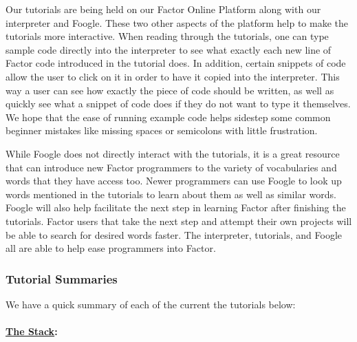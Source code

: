 \documentclass[
]{article}
\begin{document}
Our tutorials are being held on our Factor Online Platform along with
our interpreter and Foogle. These two other aspects of the platform help
to make the tutorials more interactive. When reading through the
tutorials, one can type sample code directly into the interpreter to see
what exactly each new line of Factor code introduced in the tutorial
does. In addition, certain snippets of code allow the user to click on
it in order to have it copied into the interpreter. This way a user can
see how exactly the piece of code should be written, as well as quickly
see what a snippet of code does if they do not want to type it
themselves. We hope that the ease of running example code helps sidestep
some common beginner mistakes like missing spaces or semicolons with
little frustration.

While Foogle does not directly interact with the tutorials, it is a
great resource that can introduce new Factor programmers to the variety
of vocabularies and words that they have access too. Newer programmers
can use Foogle to look up words mentioned in the tutorials to learn
about them as well as similar words. Foogle will also help facilitate
the next step in learning Factor after finishing the tutorials. Factor
users that take the next step and attempt their own projects will be
able to search for desired words faster. The interpreter, tutorials, and
Foogle all are able to help ease programmers into Factor.

\hypertarget{tutorial-summaries}{%
\subsubsection{Tutorial Summaries}\label{tutorial-summaries}}

We have a quick summary of each of the current the tutorials below:

\hypertarget{the-stack}{%
\paragraph{\texorpdfstring{\href{https://factor.netlify.app/book/the-stack.md}{The
Stack}:}{The Stack:}}\label{the-stack}}
\end{document}
